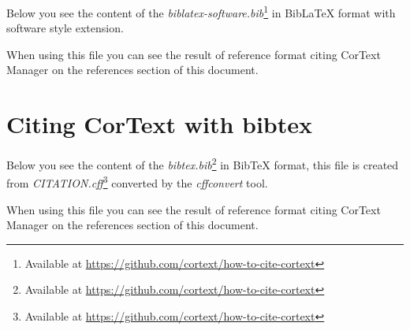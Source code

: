 \documentclass{article}
\begin{document}
Below you see the content of the {\em biblatex-software.bib}\footnote{Available
at \url{https://github.com/cortext/how-to-cite-cortext}} in BibLaTeX format
with software style extension\cite{softwareheritageorg_citing_2020}.



When using this file you can see the result of reference format citing CorText
Manager \cite{cortext_manager_v2} on the references section of this document.

\section{Citing CorText with bibtex}

Below you see the content of the {\em bibtex.bib}\footnote{Available
at \url{https://github.com/cortext/how-to-cite-cortext}} in BibTeX format,
this file is created from {\em CITATION.cff}\footnote{Available
at \url{https://github.com/cortext/how-to-cite-cortext}} converted by the {\em cffconvert} tool.


When using this file you can see the result of reference format citing CorText
Manager \cite{cortext_manager_v2_bibtex} on the references section of this document.

\printbibliography
\end{document}
